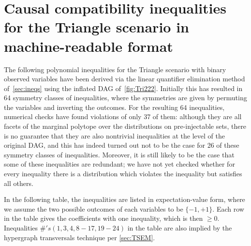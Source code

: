 {\section{Causal compatibility inequalities for the Triangle scenario in machine-readable format}
\label{sec:38ineqs}

The following polynomial inequalities for the Triangle scenario with binary observed variables have been derived via the linear quantifier elimination method of~\cref{sec:ineqs} using the inflated DAG of~\cref{fig:Tri222}. Initially this has resulted in 64 symmetry classes of inequalities, where the symmetries are given by permuting the variables and inverting the outcomes. For the resulting 64 inequalities, numerical checks have found violations of only 37 of them: although they are all facets of the marginal polytope over the distributions on pre-injectable sets, there is no guarantee that they are also nontrivial inequalities at the level of the original DAG, and this has indeed turned out not to be the case for 26 of these symmetry classes of inequalities. Moreover, it is still likely to be the case that some of these inequalities are redundant; we have not yet checked whether for every inequality there is a distribution which violates the inequality but satisfies all others.

In the following table, the inequalities are listed in expectation-value form, where we assume the two possible outcomes of each variables to be $\{-1,+1\}$. Each row in the table gives the coefficients with one inequality, which is then $\geq 0$. Inequalities $\#'s (1, 3, 4, 8-17, 19-24)$ in the table are also implied by the hypergraph transversals technique per \cref{sec:TSEM}.

}
